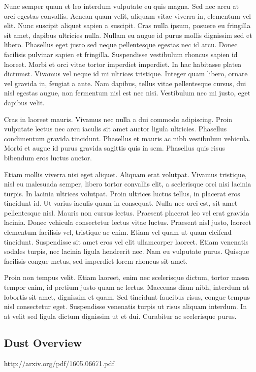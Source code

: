 \documentclass[usenatbib]{mn2e}
\begin{document}
Nunc semper quam et leo interdum vulputate eu quis magna. Sed nec arcu at orci egestas convallis. Aenean quam velit, aliquam vitae viverra in, elementum vel elit. Nunc suscipit aliquet sapien a suscipit. Cras nulla ipsum, posuere eu fringilla sit amet, dapibus ultricies nulla. Nullam eu augue id purus mollis dignissim sed et libero. Phasellus eget justo sed neque pellentesque egestas nec id arcu. Donec facilisis pulvinar sapien et fringilla. Suspendisse vestibulum rhoncus sapien id laoreet. Morbi et orci vitae tortor imperdiet imperdiet. In hac habitasse platea dictumst. Vivamus vel neque id mi ultrices tristique. Integer quam libero, ornare vel gravida in, feugiat a ante. Nam dapibus, tellus vitae pellentesque cursus, dui nisl egestas augue, non fermentum nisl est nec nisi. Vestibulum nec mi justo, eget dapibus velit.

Cras in laoreet mauris. Vivamus nec nulla a dui commodo adipiscing. Proin vulputate lectus nec arcu iaculis sit amet auctor ligula ultricies. Phasellus condimentum gravida tincidunt. Phasellus et mauris ac nibh vestibulum vehicula. Morbi et augue id purus gravida sagittis quis in sem. Phasellus quis risus bibendum eros luctus auctor.

Etiam mollis viverra nisi eget aliquet. Aliquam erat volutpat. Vivamus tristique, nisl eu malesuada semper, libero tortor convallis elit, a scelerisque orci nisi lacinia turpis. In lacinia ultrices volutpat. Proin ultrices luctus tellus, in placerat eros tincidunt id. Ut varius iaculis quam in consequat. Nulla nec orci est, sit amet pellentesque nisl. Mauris non cursus lectus. Praesent placerat leo vel erat gravida lacinia. Donec vehicula consectetur lectus vitae luctus. Praesent nisl justo, laoreet elementum facilisis vel, tristique ac enim. Etiam vel quam ut quam eleifend tincidunt. Suspendisse sit amet eros vel elit ullamcorper laoreet. Etiam venenatis sodales turpis, nec lacinia ligula hendrerit nec. Nam eu vulputate purus. Quisque facilisis congue metus, sed imperdiet lorem rhoncus sit amet.

Proin non tempus velit. Etiam laoreet, enim nec scelerisque dictum, tortor massa tempor enim, id pretium justo quam ac lectus. Maecenas diam nibh, interdum at lobortis sit amet, dignissim et quam. Sed tincidunt faucibus risus, congue tempus nisl consectetur eget. Suspendisse venenatis turpis ut risus aliquam interdum. In at velit sed ligula dictum dignissim ut et dui. Curabitur ac scelerisque purus.

\subsection{Dust Overview}
http://arxiv.org/pdf/1605.06671.pdf
\end{document}
